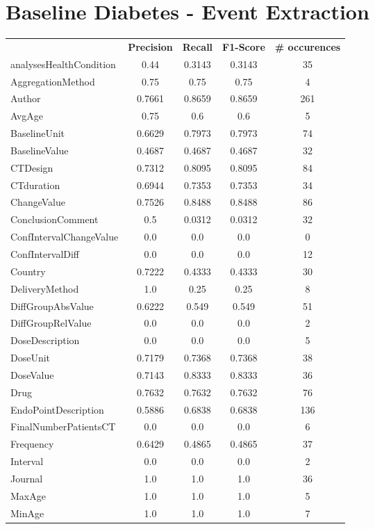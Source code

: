 \section{Baseline Diabetes - Event Extraction}
\begin{longtable}{ l c c c c}
 & \textbf{Precision} & \textbf{Recall} & \textbf{F1-Score} & \textbf{\# occurences} \\ \cline{1-5}
analysesHealthCondition & 0.44 & 0.3143 & 0.3143 & 35\\
AggregationMethod & 0.75 & 0.75 & 0.75 & 4\\
Author & 0.7661 & 0.8659 & 0.8659 & 261\\
AvgAge & 0.75 & 0.6 & 0.6 & 5\\
BaselineUnit & 0.6629 & 0.7973 & 0.7973 & 74\\
BaselineValue & 0.4687 & 0.4687 & 0.4687 & 32\\
CTDesign & 0.7312 & 0.8095 & 0.8095 & 84\\
CTduration & 0.6944 & 0.7353 & 0.7353 & 34\\
ChangeValue & 0.7526 & 0.8488 & 0.8488 & 86\\
ConclusionComment & 0.5 & 0.0312 & 0.0312 & 32\\
ConfIntervalChangeValue & 0.0 & 0.0 & 0.0 & 0\\
ConfIntervalDiff & 0.0 & 0.0 & 0.0 & 12\\
Country & 0.7222 & 0.4333 & 0.4333 & 30\\
DeliveryMethod & 1.0 & 0.25 & 0.25 & 8\\
DiffGroupAbsValue & 0.6222 & 0.549 & 0.549 & 51\\
DiffGroupRelValue & 0.0 & 0.0 & 0.0 & 2\\
DoseDescription & 0.0 & 0.0 & 0.0 & 5\\
DoseUnit & 0.7179 & 0.7368 & 0.7368 & 38\\
DoseValue & 0.7143 & 0.8333 & 0.8333 & 36\\
Drug & 0.7632 & 0.7632 & 0.7632 & 76\\
EndoPointDescription & 0.5886 & 0.6838 & 0.6838 & 136\\
FinalNumberPatientsCT & 0.0 & 0.0 & 0.0 & 6\\
Frequency & 0.6429 & 0.4865 & 0.4865 & 37\\
Interval & 0.0 & 0.0 & 0.0 & 2\\
Journal & 1.0 & 1.0 & 1.0 & 36\\
MaxAge & 1.0 & 1.0 & 1.0 & 5\\
MinAge & 1.0 & 1.0 & 1.0 & 7\\

\end{longtable}
